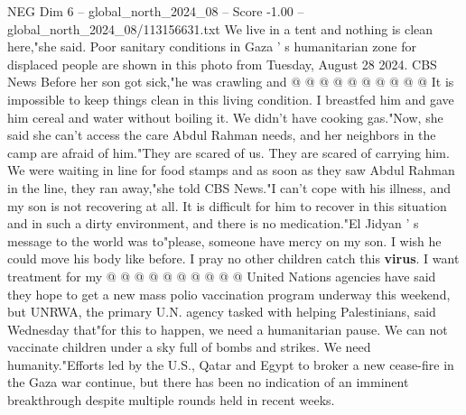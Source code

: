 \begin{textsample}{NEG Dim 6 – global\_north\_2024\_08 – Score -1.00 – global\_north\_2024\_08/113156631.txt}
We live in a tent and nothing is clean here,"she said.
Poor sanitary conditions in Gaza ' s humanitarian zone for displaced people are shown in this photo from Tuesday, August 28 2024.
CBS News Before her son got sick,"he was crawling and @ @ @ @ @ @ @ @ @ @ It is impossible to keep things clean in this living condition.
I breastfed him and gave him cereal and water without boiling it.
We didn't have cooking gas."Now, she said she can't access the care Abdul Rahman needs, and her neighbors in the camp are afraid of him."They are scared of us.
They are scared of carrying him.
We were waiting in line for food stamps and as soon as they saw Abdul Rahman in the line, they ran away,"she told CBS News."I can't cope with his illness, and my son is not recovering at all.
It is difficult for him to recover in this situation and in such a dirty environment, and there is no medication."El Jidyan ' s message to the world was to"please, someone have mercy on my son.
I wish he could move his body like before.
I pray no other children catch this \textbf{virus}.
I want treatment for my @ @ @ @ @ @ @ @ @ @ United Nations agencies have said they hope to get a new mass polio vaccination program underway this weekend, but UNRWA, the primary U.N. agency tasked with helping Palestinians, said Wednesday that"for this to happen, we need a humanitarian pause.
We can not vaccinate children under a sky full of bombs and strikes.
We need humanity."Efforts led by the U.S., Qatar and Egypt to broker a new cease-fire in the Gaza war continue, but there has been no indication of an imminent breakthrough despite multiple rounds held in recent weeks.

\end{textsample}
